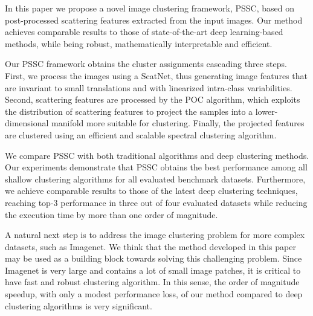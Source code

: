 \documentclass[11pt]{article}
\theoremstyle{definition}
\begin{document}
In this paper we propose a novel image clustering framework, PSSC, based on post-processed scattering features extracted from the input images. Our method achieves comparable results to those of state-of-the-art deep learning-based methods, while being robust, mathematically interpretable and efficient.

Our PSSC framework obtains the cluster assignments cascading three steps. First, we process the images using a ScatNet, thus generating image features that are invariant to small translations and with linearized intra-class variabilities. Second, scattering features are processed by the POC algorithm, which exploits the distribution of scattering features to project the samples into a lower-dimensional manifold more suitable for clustering. Finally, the projected features are clustered using an efficient and scalable spectral clustering algorithm.

We compare PSSC with both traditional algorithms and deep clustering methods. Our experiments demonstrate that PSSC obtains the best performance among all shallow clustering algorithms for all evaluated benchmark datasets. Furthermore, we achieve comparable results to those of the latest deep clustering techniques, reaching top-3 performance in three out of four evaluated datasets while reducing the execution time by more than one order of magnitude. 

A natural next step is to address the image clustering problem for more complex datasets, such as
Imagenet. We think that the method developed in this paper may be used as a building block towards solving
this challenging problem. Since Imagenet is very large and contains a lot of small image patches, it is critical
to have fast and robust clustering algorithm. In this sense, the order of magnitude speedup, with only a modest performance loss, of our method compared to deep clustering algorithms is very significant.




\clearpage


        


\end{document}
